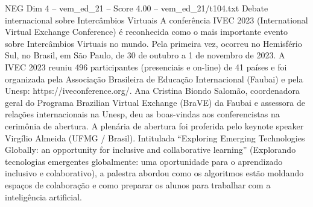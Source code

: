\begin{textsample}{NEG Dim 4 – vem\_ed\_21 – Score 4.00 – vem\_ed\_21/t104.txt}  \label{ex:f4_neg_073}
Debate internacional sobre Intercâmbios Virtuais A conferência IVEC 2023 (International Virtual Exchange Conference) é reconhecida como o mais importante evento sobre Intercâmbios Virtuais no mundo.
Pela primeira vez, ocorreu no Hemisfério Sul, no Brasil, em São Paulo, de 30 de outubro a 1 de novembro de 2023.
A IVEC 2023 reuniu 496 participantes (presenciais e on-line) de 41 países e foi organizada pela Associação Brasileira de Educação Internacional (Faubai) e pela Unesp: https://iveconference.org/.
Ana Cristina Biondo Salomão, coordenadora geral do Programa Brazilian Virtual Exchange (BraVE) da Faubai e assessora de relações internacionais na Unesp, deu as boas-vindas aos conferencistas na cerimônia de abertura.
A plenária de abertura foi proferida pelo keynote speaker Virgílio Almeida (UFMG / Brasil).
Intitulada “Exploring Emerging Technologies Globally: an opportunity for inclusive and collaborative learning” (Explorando tecnologias emergentes globalmente: uma oportunidade para o aprendizado inclusivo e colaborativo), a palestra abordou como os algoritmos estão moldando espaços de colaboração e como preparar os alunos para trabalhar com a inteligência artificial.

\end{textsample}
